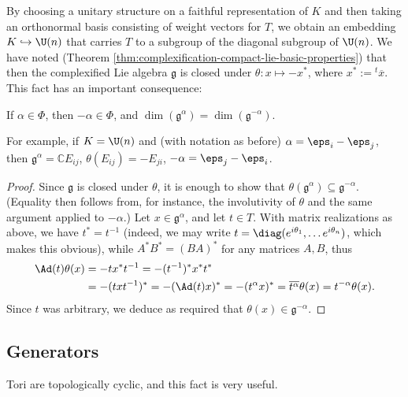 \documentclass[reqno]{amsart} 
\begin{document}
By choosing a unitary structure on a faithful representation of $K$ and then taking an orthonormal basis consisting of weight vectors for $T$, we obtain an embedding $K \hookrightarrow \U(n)$ that carries $T$ to a subgroup of the diagonal subgroup of $\U(n)$.  We have noted (Theorem \ref{thm:complexification-compact-lie-basic-properties}) that then the complexified Lie algebra $\mathfrak{g}$ is closed under $\theta : x \mapsto - x^*$, where $x^* := {}^t \overline{x}$.  This fact has an important consequence:
\begin{lemma}\label{lem:negative-roots-exist}
  If $\alpha \in \Phi$, then $- \alpha \in \Phi$, and $\dim(\mathfrak{g}^\alpha) = \dim(\mathfrak{g}^{-\alpha})$.
\end{lemma}
For example, if $K = \U(n)$ and (with notation as before) $\alpha = \eps_i - \eps_j$, then $\mathfrak{g}^\alpha = \mathbb{C} E_{i j}$, $\theta(E_{ij}) = - E_{j i}$, $- \alpha = \eps_j - \eps_i$.
\begin{proof}
  Since $\mathfrak{g}$ is closed under $\theta$, it is enough to show that $\theta(\mathfrak{g}^\alpha) \subseteq \mathfrak{g}^{-\alpha}$.  (Equality then follows from, for instance, the involutivity of $\theta$ and the same argument applied to $-\alpha$.)  Let $x \in \mathfrak{g}^\alpha$, and let $t \in T$.  With matrix realizations as above, we have $t^* = t^{-1}$ (indeed, we may write $t = \diag(e^{i \theta_1}, \dotsc e^{i \theta_n})$, which makes this obvious), while $A^* B^* = (B A)^*$ for any matrices $A,B$, thus
  \begin{align*}
    \Ad(t) \theta(x)
    &=
      -
      t
      x^*
      t^{-1}
      =
      - (t^{-1})^* x^* t^*
    \\
    &=
      -
      (t x t^{-1})^*
      =
      - (\Ad(t) x)^*
      = -(t^\alpha x)^*
      =
      \overline{t^\alpha } \theta(x)
      = t^{-\alpha} \theta(x).
  \end{align*}
  Since $t$ was arbitrary, we deduce as required that $\theta(x) \in \mathfrak{g}^{-\alpha}$.
\end{proof}

\subsection{Generators}
Tori are topologically cyclic, and this fact is very useful.
\end{document}
